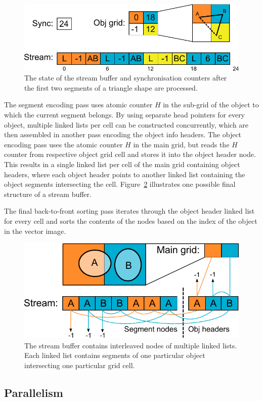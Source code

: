 \documentclass[11pt,a4paper,twoside]{article}
\begin{document}
\begin {figure}
	\centering
	\includegraphics[width=0.6\columnwidth] {figures/cell_stream}
	\caption {The state of the stream buffer and synchronisation counters after the first two segments of a triangle shape are processed.}
	\label {fig:cell_stream}
\end {figure}

The segment encoding pass uses atomic counter $H$ in the sub-grid of the object to which the current segment belongs. By using separate head pointers for every object, multiple linked lists per cell can be constructed concurrently, which are then assembled in another pass encoding the object info headers. The object encoding pass uses the atomic counter $H$ in the main grid, but reads the $H$ counter from respective object grid cell and stores it into the object header node. This results in a single linked list per cell of the main grid containing object headers, where each object header points to another linked list containing the object segments intersecting the cell. Figure~\ref{fig:obj_stream} illustrates one possible final structure of a stream buffer.

The final back-to-front sorting pass iterates through the object header linked list for every cell and sorts the contents of the nodes based on the index of the object in the vector image.

\begin {figure} 
	\centering
	\includegraphics[width=0.6\columnwidth] {figures/obj_stream}
	\caption {The stream buffer contains interleaved nodes of multiple linked lists. Each linked list contains segments of one particular object intersecting one particular grid cell.}
	\label {fig:obj_stream}
\end {figure}

\subsection {Parallelism}
\end{document}
